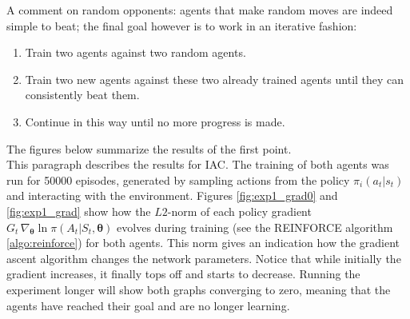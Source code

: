 A comment on random opponents: agents that make random moves are indeed simple to beat; the final goal however is to work in an iterative fashion: 
\begin{enumerate}
    \item Train two agents against two random agents.
    \item Train two new agents against these two already trained agents until they can consistently beat them.
    \item Continue in this way until no more progress is made.
\end{enumerate}
The figures below summarize the results of the first point.\\

This paragraph describes the results for IAC. The training of both agents was run for 50000 episodes, generated by sampling actions from the policy $\pi_i(a_t|s_t)$ and interacting with the environment. Figures \ref{fig:exp1_grad0} and \ref{fig:exp1_grad} show how the $L2$-norm of each policy gradient $G_t \, \nabla_{\bm{\theta}} \ln \pi(A_t|S_t,\bm{\theta})$ evolves during training (see the REINFORCE algorithm \ref{algo:reinforce}) for both agents. This norm gives an indication how the gradient ascent algorithm changes the network parameters. Notice that while initially the gradient increases, it finally tops off and starts to decrease. Running the experiment longer will show both graphs converging to zero, meaning that the agents have reached their goal and are no longer learning.\\
